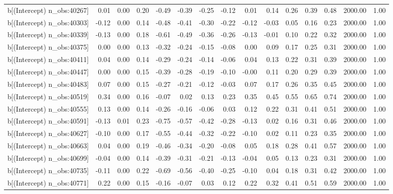 \begin{table}[ht]
\begin{tabular}{rrrrrrrrrrrrrrr}
  b[(Intercept) n\_obs:40267] & 0.01 & 0.00 & 0.20 & -0.49 & -0.39 & -0.25 & -0.12 & 0.01 & 0.14 & 0.26 & 0.39 & 0.48 & 2000.00 & 1.00 \\ 
  b[(Intercept) n\_obs:40303] & -0.12 & 0.00 & 0.14 & -0.48 & -0.41 & -0.30 & -0.22 & -0.12 & -0.03 & 0.05 & 0.16 & 0.23 & 2000.00 & 1.00 \\ 
  b[(Intercept) n\_obs:40339] & -0.13 & 0.00 & 0.18 & -0.61 & -0.49 & -0.36 & -0.26 & -0.13 & -0.01 & 0.10 & 0.22 & 0.32 & 2000.00 & 1.00 \\ 
  b[(Intercept) n\_obs:40375] & 0.00 & 0.00 & 0.13 & -0.32 & -0.24 & -0.15 & -0.08 & 0.00 & 0.09 & 0.17 & 0.25 & 0.31 & 2000.00 & 1.00 \\ 
  b[(Intercept) n\_obs:40411] & 0.04 & 0.00 & 0.14 & -0.29 & -0.24 & -0.14 & -0.06 & 0.04 & 0.13 & 0.22 & 0.31 & 0.39 & 2000.00 & 1.00 \\ 
  b[(Intercept) n\_obs:40447] & 0.00 & 0.00 & 0.15 & -0.39 & -0.28 & -0.19 & -0.10 & -0.00 & 0.11 & 0.20 & 0.29 & 0.39 & 2000.00 & 1.00 \\ 
  b[(Intercept) n\_obs:40483] & 0.07 & 0.00 & 0.15 & -0.27 & -0.21 & -0.12 & -0.03 & 0.07 & 0.17 & 0.26 & 0.35 & 0.45 & 2000.00 & 1.00 \\ 
  b[(Intercept) n\_obs:40519] & 0.34 & 0.00 & 0.16 & -0.07 & 0.02 & 0.13 & 0.23 & 0.35 & 0.45 & 0.55 & 0.65 & 0.74 & 2000.00 & 1.00 \\ 
  b[(Intercept) n\_obs:40555] & 0.13 & 0.00 & 0.14 & -0.26 & -0.16 & -0.06 & 0.03 & 0.12 & 0.22 & 0.31 & 0.41 & 0.51 & 2000.00 & 1.00 \\ 
  b[(Intercept) n\_obs:40591] & -0.13 & 0.01 & 0.23 & -0.75 & -0.57 & -0.42 & -0.28 & -0.13 & 0.02 & 0.16 & 0.31 & 0.46 & 2000.00 & 1.00 \\ 
  b[(Intercept) n\_obs:40627] & -0.10 & 0.00 & 0.17 & -0.55 & -0.44 & -0.32 & -0.22 & -0.10 & 0.02 & 0.11 & 0.23 & 0.35 & 2000.00 & 1.00 \\ 
  b[(Intercept) n\_obs:40663] & 0.04 & 0.00 & 0.19 & -0.46 & -0.34 & -0.20 & -0.08 & 0.05 & 0.18 & 0.28 & 0.41 & 0.57 & 2000.00 & 1.00 \\ 
  b[(Intercept) n\_obs:40699] & -0.04 & 0.00 & 0.14 & -0.39 & -0.31 & -0.21 & -0.13 & -0.04 & 0.05 & 0.13 & 0.23 & 0.31 & 2000.00 & 1.00 \\ 
  b[(Intercept) n\_obs:40735] & -0.11 & 0.00 & 0.22 & -0.69 & -0.56 & -0.40 & -0.25 & -0.10 & 0.04 & 0.18 & 0.31 & 0.42 & 2000.00 & 1.00 \\ 
  b[(Intercept) n\_obs:40771] & 0.22 & 0.00 & 0.15 & -0.16 & -0.07 & 0.03 & 0.12 & 0.22 & 0.32 & 0.41 & 0.51 & 0.59 & 2000.00 & 1.00 \\ 

\end{tabular}
\end{table}
